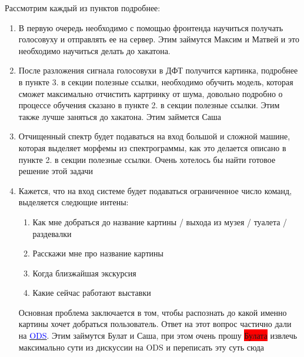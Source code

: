 \documentclass[11pt]{article}
\begin{document}
\begin{center}

\end{center}

Рассмотрим каждый из пунктов подробнее:
\begin{enumerate}
\item В первую очередь необходимо с помощью фронтенда научиться получать голосовуху и отправлять ее на сервер. Этим займутся Максим и Матвей и это необходимо научиться делать до хакатона.
\item После разложения сигнала голосовухи в ДФТ получится картинка, подробнее в пункте 3. в секции полезные ссылки, необходимо обучить модель, которая сможет максимально отчистить картринку от шума, довольно подробно о процессе обучения сказано в пункте 2. в секции полезные ссылки. Этим также лучше заняться до хакатона. Этим займется Саша
\item Отчищенный спектр будет подаваться на вход большой и сложной машине, которая выделяет морфемы из спектрограммы, как это делается описано в пункте 2. в секции полезные ссылки. Очень хотелось бы найти готовое решение этой задачи
\item Кажется, что на вход системе будет подаваться ограниченное число команд, выделяется следющие интены:\begin{enumerate}
\item Как мне добраться до название картины / выхода из музея / туалета / раздевалки
\item Расскажи мне про название картины
\item Когда близжайшая экскурсия
\item Какие сейчас работают выставки 
\end{enumerate}

Основная проблема заключается в том, чтобы распознать до какой именно картины хочет добраться пользователь. Ответ на этот вопрос частично дали на \href{https://opendatascience.slack.com/archives/C04N3UMSL/p1568308189002800}{\textcolor{blue}{ODS}}. Этим займутся Булат и Саша, при этом очень прошу \colorbox{red}{Булата} извлечь максимально сути из дискуссии на ODS и переписать эту суть сюда


\end{enumerate}
\end{document}
